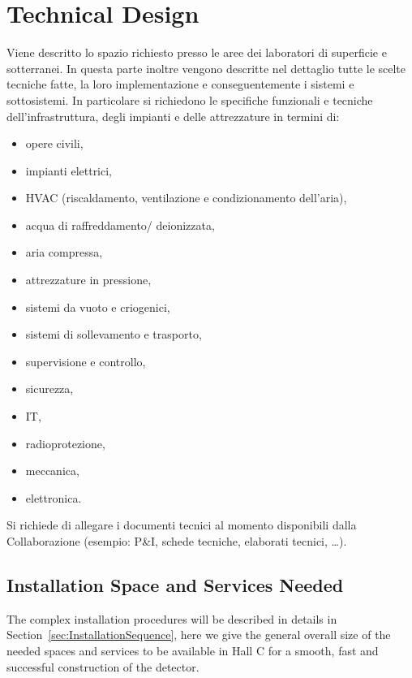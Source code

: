 \section{Technical Design}
\label{sec:TechnicalDesign}

{\bf\color{red}

Viene descritto lo spazio richiesto presso le aree dei laboratori di superficie e sotterranei.
In questa parte inoltre vengono descritte nel dettaglio tutte le scelte tecniche fatte, la loro implementazione e conseguentemente i sistemi e sottosistemi. In particolare si richiedono le specifiche funzionali e tecniche dell’infrastruttura, degli impianti e delle attrezzature in termini di:
\begin{itemize}
\item opere civili, 
\item impianti elettrici, 
\item HVAC (riscaldamento, ventilazione e condizionamento dell’aria), 
\item acqua di raffreddamento/ deionizzata, 
\item aria compressa,
\item attrezzature in pressione, 
\item sistemi da vuoto e criogenici, 
\item sistemi di sollevamento e trasporto, 
\item supervisione e controllo, 
\item sicurezza, 
\item  IT, 
\item radioprotezione, 
\item meccanica, 
\item elettronica.
\end{itemize}
Si richiede di allegare i documenti tecnici al momento disponibili dalla Collaborazione (esempio: P\&I, schede tecniche, elaborati tecnici, …).
}

\vspace{1cm}

\subsection{Installation Space and Services Needed}
\label{sec:SpaceAndService}
The complex installation procedures will be described in details in Section~\ref{sec:InstallationSequence}, here we give the general overall size of the needed spaces and services to be available in Hall C for a smooth, fast and successful construction of the \DSks detector.

